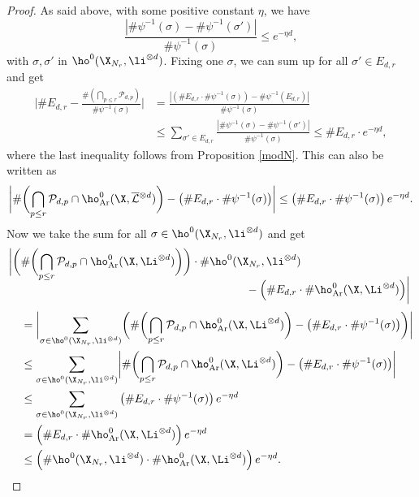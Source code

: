 \begin{proof}
As said above, with some positive constant $\eta$, we have
\[
\frac{| \#\psi^{-1}(\sigma)- \#\psi^{-1}(\sigma') |}{\#\psi^{-1}(\sigma)}\leq e^{-\eta d},
\]
with $\sigma,\sigma'$ in $ \ho^0(\X_{N_r},\li^{\otimes d})$. Fixing one $\sigma$, we can sum up for all $\sigma'\in E_{d,r}$ and get
\begin{align*}
\biggl| \#E_{d,r}-\frac{\#(\bigcap_{p\leq r}\mathcal{P}_{d,p})}{\#\psi^{-1}(\sigma)} \biggr| &=\frac{| \left(\#E_{d,r}\cdot \#\psi^{-1}(\sigma)\right)- \#\psi^{-1}(E_{d,r}) |}{\#\psi^{-1}(\sigma)} \\
&\leq \sum_{\sigma'\in E_{d,r}}\frac{| \#\psi^{-1}(\sigma)- \#\psi^{-1}(\sigma') |}{\#\psi^{-1}(\sigma)} \leq \#E_{d,r}\cdot e^{-\eta d},
\end{align*}
where the last inequality follows from Proposition \ref{modN}. This can also be written as
\[
\biggl| \#\biggl(\bigcap_{p\leq r}\mathcal{P}_{d,p}\cap \ho^0_{\mathrm{Ar}}(\X, \overline{\mathcal{L}}{}^{\otimes d})\biggr)-\left(\#E_{d,r}\cdot\#\psi^{-1}(\sigma)\right) \biggr|\leq \left(\#E_{d,r}\cdot\#\psi^{-1}(\sigma)\right) e^{-\eta d}.
\]
Now we take the sum for all $\sigma \in \ho^0(\X_{N_r}, \li^{\otimes d})$ and get
\begin{align*}
\biggl| \biggl(&\#\biggl(\bigcap_{p\leq r}\mathcal{P}_{d,p}\cap \ho^0_{\mathrm{Ar}}(\X, \Li^{\otimes d})\biggr)\biggr)\cdot \#\ho^0(\X_{N_r}, \li^{\otimes d})\\[-8pt]
&\hspace*{6.95cm}-\left(\#E_{d,r}\cdot\#\ho^0_{\mathrm{Ar}}(\X, \Li^{\otimes d})\right) \biggr| \\[3pt]
&= \biggl| \sum_{\sigma \in \ho^0(\X_{N_r}, \li^{\otimes d})}\biggl(\#\biggl(\bigcap_{p\leq r}\mathcal{P}_{d,p}\cap \ho^0_{\mathrm{Ar}}(\X, \Li^{\otimes d})\biggr)-\left(\#E_{d,r}\cdot\#\psi^{-1}(\sigma)\right) \biggr)\biggr| \\
&\leq \sum_{\sigma \in \ho^0(\X_{N_r}, \li^{\otimes d})}\biggl| \#\biggl(\bigcap_{p\leq r}\mathcal{P}_{d,p}\cap \ho^0_{\mathrm{Ar}}(\X, \Li^{\otimes d}) \biggr)-\left(\#E_{d,r}\cdot\#\psi^{-1}(\sigma)\right) \biggr| \\
&\leq \sum_{\sigma \in \ho^0(\X_{N_r}, \li^{\otimes d})}\left(\#E_{d,r}\cdot\#\psi^{-1}(\sigma)\right) e^{-\eta d}\\
&= \left(\#E_{d,r}\cdot\#\ho^0_{\mathrm{Ar}}(\X, \Li^{\otimes d})\right) e^{-\eta d} \\
&\leq \left(\#\ho^0(\X_{N_r}, \li^{\otimes d})\cdot\#\ho^0_{\mathrm{Ar}}(\X, \Li^{\otimes d})\right) e^{-\eta d}.
\end{align*}

\end{proof}
